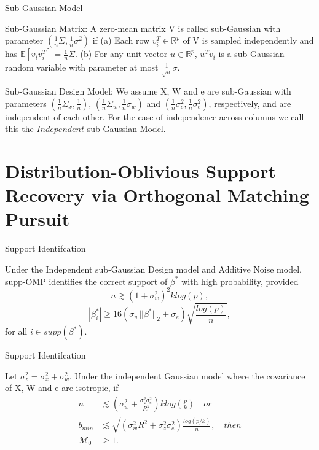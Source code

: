 \documentclass[unknownkeysallowed]{beamer}
\begin{document}
\begin{frame}{Sub-Gaussian Model}
	\begin{definition}
		Sub-Gaussian Matrix: A zero-mean matrix V is called sub-Gaussian with parameter $(\frac{1}{n}\Sigma,\frac{1}{n}\sigma^2)$ if (a) Each row $v_i^T \in \mathbb{R}^p$ of V is sampled independently and has $\mathbb{E}[v_iv_i^T]=\frac{1}{n}\Sigma$. (b) For any unit vector $u \in \mathbb{R}^p$, $u^Tv_i$ is a sub-Gaussian random variable with parameter at most $\frac{1}{\sqrt{n}}\sigma$.
	\end{definition}
	\begin{definition}
		Sub-Gaussian Design Model: We assume X, W and e are sub-Gaussian with parameters $(\frac{1}{n}\Sigma_x,\frac{1}{n})$, $(\frac{1}{n}\Sigma_w, \frac{1}{n}\sigma_w)$ and $(\frac{1}{n}\sigma_e^2, \frac{1}{n}\sigma_e^2)$, respectively, and are independent of each other. For the case of independence across columns we call this the $Independent$ sub-Gaussian Model.
	\end{definition}
\end{frame}



\section{Distribution-Oblivious Support Recovery via Orthogonal Matching Pursuit}
\begin{frame}{Support Identifcation}
	\begin{theorem}
		Under the Independent sub-Gaussian Design model and Additive Noise model, supp-OMP identifies the correct support of $\beta^*$ with high probability, provided
		\begin{equation*}
		n \gtrsim (1+\sigma^2_w)^2klog(p),
		\end{equation*}
		\begin{equation*}
		|\beta^*_i| \geq 16(\sigma_w||\beta^*||_2 + \sigma_e)\sqrt{\frac{log(p)}{n}},
		\end{equation*}
		for all $i \in supp(\beta^*)$.
	\end{theorem}

\end{frame}


\begin{frame}{Support Identifcation}
	\begin{theorem}
		Let $\sigma^2_z = \sigma^2_x + \sigma^2_w$. Under the independent Gaussian model where the covariance of X, W and e are isotropic, if 
		\begin{align*}
		n &\lesssim (\sigma^2_w + \frac{\sigma^2_z \sigma^2_e}{R^2})k log(\frac{p}{k}) \quad or\\
		b_{min} &\lesssim \sqrt{(\sigma^2_w R^2 + \sigma^2_z \sigma^2_e) \frac{log(p/k)}{n}}, \quad then\\
		\mathcal{M}_0 &\geq 1.
		\end{align*}
	\end{theorem}

\end{frame}
\end{document}
